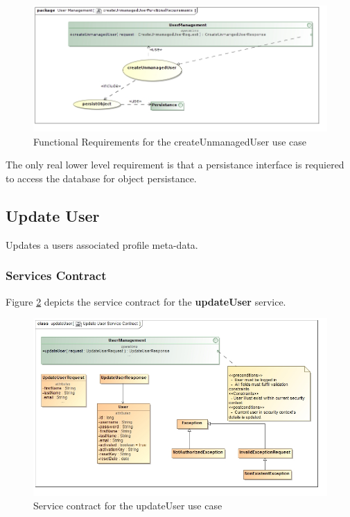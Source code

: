 \begin{figure}[H]
	\begin{center}
		\includegraphics[scale=0.55]{../Diagrams and Charts/Users/createUnmanagedUserFunctionalRequirements.jpg}
		\caption{Functional Requirements for the createUnmanagedUser use case}
		\label{fig:CreateUnmanagedUserFR}
	\end{center}
\end{figure}

The only real lower level requirement is that a persistance interface is requiered
to access the database for object persistance.

\subsection{Update User}
Updates a users associated profile meta-data.

\subsubsection{Services Contract}
Figure \ref{fig:updateUserServicesContract} depicts the service contract for the \textbf{updateUser} service.

\begin{figure}[H]
  \begin{center}
  \includegraphics[scale=0.55]{../Diagrams and Charts/Users/Update User Service Contract.jpg}
  \caption{Service contract for the updateUser use case}
  \label{fig:updateUserServicesContract}
  \end{center}
\end{figure}


